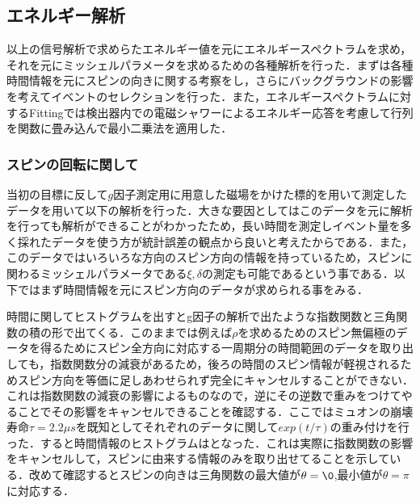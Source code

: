 %

\subsection{エネルギー解析}
以上の信号解析で求めらたエネルギー値を元にエネルギースペクトラムを求め，それを元にミッシェルパラメータを求めるための各種解析を行った．まずは各種時間情報を元にスピンの向きに関する考察をし，さらにバックグラウンドの影響を考えてイベントのセレクションを行った．また，エネルギースペクトラムに対するFittingでは検出器内での電磁シャワーによるエネルギー応答を考慮して行列を関数に畳み込んで最小二乗法を適用した．

\subsubsection{スピンの回転に関して}
当初の目標に反して$g$因子測定用に用意した磁場をかけた標的を用いて測定したデータを用いて以下の解析を行った．大きな要因としてはこのデータを元に解析を行っても解析ができることがわかったため，長い時間を測定しイベント量を多く採れたデータを使う方が統計誤差の観点から良いと考えたからである．また，このデータではいろいろな方向のスピン方向の情報を持っているため，スピンに関わるミッシェルパラメータである$\xi,\delta$の測定も可能であるという事である．以下ではまず時間情報を元にスピン方向のデータが求められる事をみる．

時間に関してヒストグラムを出すとg因子の解析で出たような指数関数と三角関数の積の形で出てくる．このままでは例えば$\rho$を求めるためのスピン無偏極のデータを得るためにスピン全方向に対応する一周期分の時間範囲のデータを取り出しても，指数関数分の減衰があるため，後ろの時間のスピン情報が軽視されるためスピン方向を等価に足しあわせられず完全にキャンセルすることができない．これは指数関数の減衰の影響によるものなので，逆にその逆数で重みをつけてやることでその影響をキャンセルできることを確認する．ここではミュオンの崩壊寿命$\tau=2.2\mu s$を既知としてそれぞれのデータに関して$exp(t/\tau)$の重み付けを行った．すると時間情報のヒストグラムはとなった．これは実際に指数関数の影響をキャンセルして，スピンに由来する情報のみを取り出せてることを示している．改めて確認するとスピンの向きは三角関数の最大値が$\theta=\0$,最小値が$\theta=\pi$に対応する．

